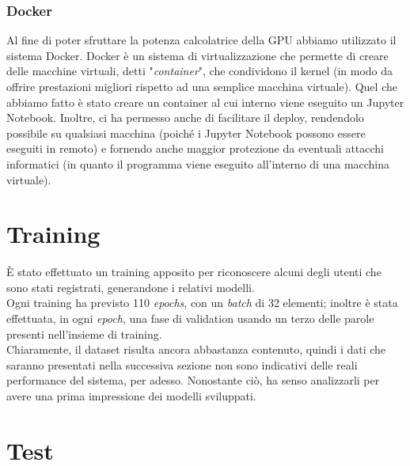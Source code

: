 \documentclass[8pt,notitlepage]{report}
\begin{document}
	\subsubsection*{Docker}
		Al fine di poter sfruttare la potenza calcolatrice della GPU abbiamo utilizzato il sistema Docker. Docker è un sistema di virtualizzazione che permette di creare delle macchine virtuali, detti "\textit{container}", che condividono il kernel (in modo da offrire prestazioni migliori rispetto ad una semplice macchina virtuale). Quel che abbiamo fatto è stato creare un container al cui interno viene eseguito un Jupyter Notebook. Inoltre, ci ha permesso anche di facilitare il deploy, rendendolo possibile su qualsiasi macchina (poiché i Jupyter Notebook possono essere eseguiti in remoto) e fornendo anche maggior protezione da eventuali attacchi informatici (in quanto il programma viene eseguito all'interno di una macchina virtuale). 
	
	\section{Training}
		È stato effettuato un training apposito per riconoscere alcuni degli utenti che sono stati registrati, generandone i relativi modelli. \\ 
		Ogni training ha previsto 110 \textit{epochs}, con un \textit{batch} di 32 elementi; inoltre è stata effettuata, in ogni \textit{epoch}, una fase di validation usando un terzo delle parole presenti nell'insieme di training. \\
		Chiaramente, il dataset risulta ancora abbastanza contenuto, quindi i dati che saranno presentati nella successiva sezione non sono indicativi delle reali performance del sistema, per adesso. Nonostante ciò, ha senso analizzarli per avere una prima impressione dei modelli sviluppati.
		
	\section{Test}
		
\end{document}
